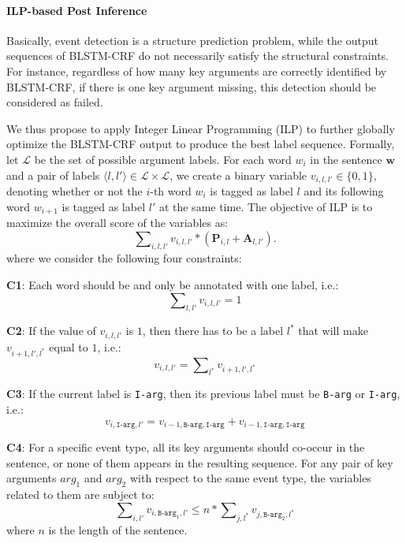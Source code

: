 \paragraph{ILP-based Post Inference}
Basically, event detection is a structure prediction problem, while the output sequences of BLSTM-CRF do not necessarily satisfy the structural constraints. For instance, regardless of how many key arguments are correctly identified by BLSTM-CRF, if there is one key argument missing, this detection should be considered as failed.

We thus propose to apply Integer Linear Programming (ILP) to further globally optimize the BLSTM-CRF output  to produce the best label sequence.
Formally, let $\mathcal{L}$ be the set of possible argument labels. For each word $w_i$ in the sentence $\bm{w}$ and a pair of labels $ \langle l, l' \rangle \in \mathcal{L} \times \mathcal{L}$, we create a binary variable ${v_{i,l,l'} \in \{0, 1\}}$, denoting whether or not the $i$-th word $w_i$ is tagged as label $l$ and its following word $w_{i+1}$ is tagged as label $l'$ at the same time. The objective of ILP is to maximize the overall score of the variables as:
\begin{displaymath}
	\sum\nolimits_{i, l, l'}v_{i,l,l'} * (\textbf{P}_{i,l}+\textbf{A}_{l,l'}) .
\end{displaymath}
where we consider the following four constraints:

\textbf{C1}: Each word should be and only be annotated with one label, i.e.:
\begin{equation}
	\sum\nolimits_{l,l'}v_{i,l,l'}=1
\end{equation}

\textbf{C2}: If the value of $v_{i,l,l'}$ is $1$, then there has to be a label $l^*$ that will make $v_{i+1,l',l^*}$ equal to $1$, i.e.:
\begin{equation}
	v_{i,l,l'} = \sum\nolimits_{l^*}v_{i+1,l',l^*}
\end{equation}

\textbf{C3}: If the current label is \texttt{I-arg}, then its previous label must be \texttt{B-arg} or \texttt{I-arg}, i.e.:
\begin{equation}
	v_{i,\texttt{I-arg},l'} = v_{i-1,\texttt{B-arg},\texttt{I-arg}} + v_{i-1, \texttt{I-arg}, \texttt{I-arg}}
\end{equation}

\textbf{C4}: For a specific event type, all its key arguments should co-occur in the sentence, or none of them appears in the resulting sequence. For any pair of key arguments $arg_1$ and $arg_2$ with respect to the same event type, the variables related to them are subject to:
\begin{equation}
	\sum\nolimits_{i,l'}{v_{i,\texttt{B-arg}_1,l'}} \leq n * \sum\nolimits_{j,l^*}{v_{j,\texttt{B-arg}_2,l^*}}
\end{equation}
where $n$ is the length of the sentence.

